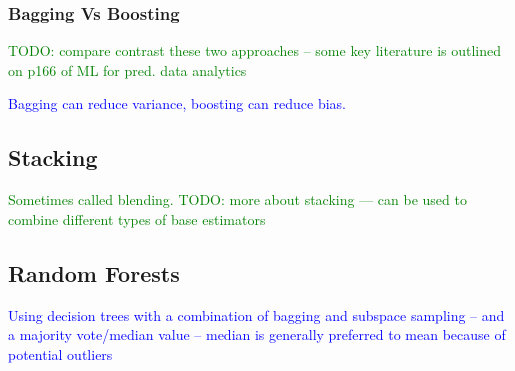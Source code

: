 \subsubsection{Bagging Vs Boosting}

\textcolor{green}{TODO: compare contrast these two approaches -- some key literature is outlined on p166 of ML for pred. data analytics}

\textcolor{blue}{Bagging can reduce variance, boosting can reduce bias.}

\subsection{Stacking}

\textcolor{green}{Sometimes called {blending}. TODO: more about stacking --- can be used to combine different types of base estimators}

\subsection{Random Forests}

\textcolor{blue}{Using decision trees with a combination of bagging and subspace sampling -- and a majority vote/median value -- median is generally preferred to mean because of potential outliers}
